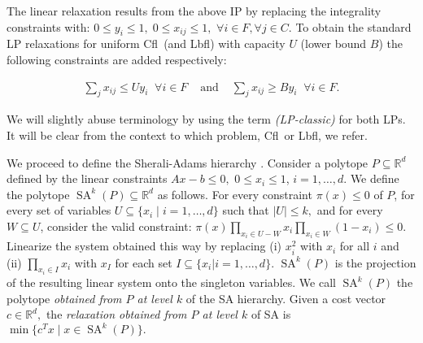 \documentclass[11pt]{article}
\newcommand{\lbfl}{{\sc Lbfl}}
\newcommand{\cfl}{{\sc Cfl}}
\newcommand{\opn}{\operatorname}
\begin{document}
\noindent 
The linear relaxation results  from the above IP by replacing the integrality constraints
 with: 
$ 
0 \leq y_i \leq 1, \; 0 \leq x_{ij} \leq 1,$   $\forall i \in F, \forall j \in C. 
$
To obtain the standard LP relaxations for 
uniform \cfl\ (and \lbfl) with capacity $U$ (lower bound $B$)
the following constraints are added
respectively: 


\vspace*{-0.2cm}
\[ \begin{array}{ccc}
\sum_ {j} x_{ij} \leq U y_i  \;\;   \forall i \in F     &  \mbox{ and }& 
\sum_ {j} x_{ij} \geq By_i   \;\;  \forall i \in F.  
\end{array}  \]


We will slightly abuse terminology by 
using  the term {\em (LP-classic)} for both LPs. It will be clear from the context to
which problem, \cfl\ or \lbfl,  we refer. 


We proceed to define the Sherali-Adams hierarchy \cite{SheraliA90}. 
Consider a polytope $P\subseteq \mathbb{R}^d$ defined by the linear
constraints $A{x}-{b}\leq 0,$
$0 \leq x_i \leq 1$, $i = 1,\ldots,d$. We define the polytope 
$\opn{SA}^k(P)\subseteq
\mathbb{R}^d$ as follows. For every constraint $\pi(x)\leq 0$
of $P$, for every set of variables $U\subseteq \{x_i \mid i=1,\ldots,d\}$ such that
$|U|\leq k,$ and for every $W\subseteq U$, consider the valid constraint:
$\pi(x)\prod_{x_i\in U-W}x_i \prod_{x_i\in W}(1-x_i)\leq 0$.
Linearize the system obtained this way by replacing (i) $x_i^2$ with
$x_i$ for all $i$ and (ii) $\prod_{x_i\in I}x_i$
with  $x_I$ for each set $I\subseteq  \{x_i|i=1,\ldots,d\}$. $\opn{SA}^k(P)$
is the projection of the resulting linear system onto the singleton
variables. We call $\opn{SA}^k(P)$ the polytope {\em obtained from $P$ 
at level $k$} of the SA
hierarchy. Given a cost vector $c \in \mathbb{R}^d,$ the {\em relaxation
obtained from $P$ at level $k$} of SA is $\min \{c^T x \mid x \in \opn{SA}^k(P) \}.$ 
\end{document}
